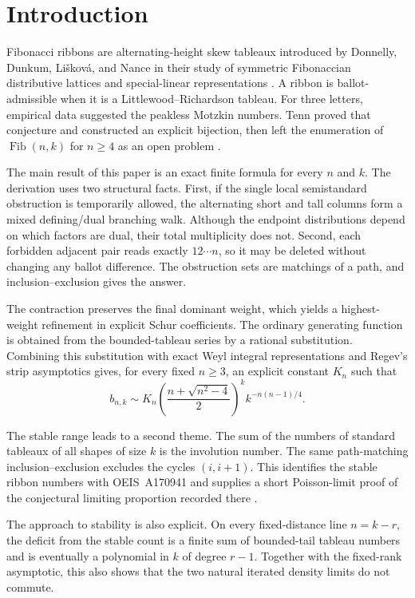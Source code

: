 \documentclass[11pt]{article}
\theoremstyle{definition}
\begin{document}
\section{Introduction}

Fibonacci ribbons are alternating-height skew tableaux introduced by
Donnelly, Dunkum, Li\v{s}kov\'a, and Nance in their study of symmetric
Fibonaccian distributive lattices and special-linear representations
\cite{DonnellyEtAl2023}.  A ribbon is ballot-admissible when it is a
Littlewood--Richardson tableau.  For three letters, empirical data suggested
the peakless Motzkin numbers.  Tenn proved that conjecture and constructed an
explicit bijection, then left the enumeration of
$\operatorname{Fib}(n,k)$ for $n\ge4$ as an open problem
\cite{Tenn2026}.

The main result of this paper is an exact finite formula for every $n$ and
$k$.  The derivation uses two structural facts.  First, if the
single local semistandard obstruction is temporarily allowed, the alternating
short and tall columns form a mixed defining/dual branching walk.  Although
the endpoint distributions depend on which factors are dual, their total
multiplicity does not.  Second, each forbidden adjacent pair reads exactly
$12\cdots n$, so it may be deleted without changing any ballot difference.
The obstruction sets are matchings of a path, and inclusion--exclusion gives
the answer.

The contraction preserves the final dominant weight, which yields a
highest-weight refinement in explicit Schur coefficients.  The ordinary
generating function is obtained from the bounded-tableau series by a rational
substitution.  Combining this substitution with exact Weyl integral
representations and Regev's strip asymptotics gives, for every fixed $n\ge3$,
an explicit constant $K_n$ such that
\[
 b_{n,k}\sim K_n
 \left(\frac{n+\sqrt{n^2-4}}2\right)^k
 k^{-n(n-1)/4}.
\]

The stable range leads to a second theme.  The sum of the numbers of standard
tableaux of all shapes of size $k$ is the involution number.  The same
path-matching inclusion--exclusion excludes the cycles $(i,i+1)$.  This
identifies the stable ribbon numbers with OEIS~A170941 and supplies a short
Poisson-limit proof of the conjectural limiting proportion recorded there
\cite{OEISA170941}.

The approach to stability is also explicit.  On every fixed-distance line
$n=k-r$, the deficit from the stable count is a finite sum of bounded-tail
tableau numbers and is eventually a polynomial in $k$ of degree $r-1$.
Together with the fixed-rank asymptotic, this also shows that the two natural
iterated density limits do not commute.
\end{document}
